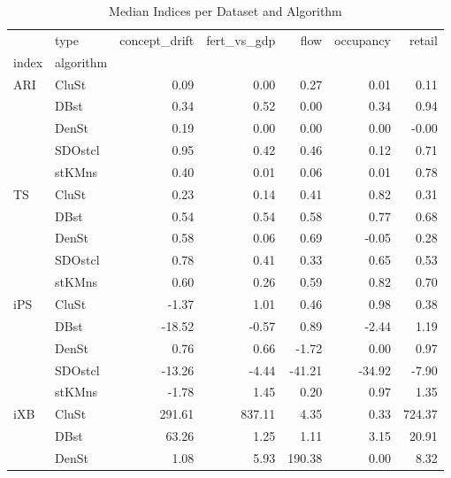 \begin{table}
\centering
\caption{Median Indices per Dataset and Algorithm}
\label{tab:median_indices}
\begin{tabular}{llrrrrr}
\toprule
     & type &  concept\_drift &  fert\_vs\_gdp &    flow &  occupancy &  retail \\
index & algorithm &                &              &         &            &         \\
\midrule
ARI & CluSt &           0.09 &         0.00 &    0.27 &       0.01 &    0.11 \\
     & DBst &           0.34 &         0.52 &    0.00 &       0.34 &    0.94 \\
     & DenSt &           0.19 &         0.00 &    0.00 &       0.00 &   -0.00 \\
     & SDOstcl &           0.95 &         0.42 &    0.46 &       0.12 &    0.71 \\
     & stKMns &           0.40 &         0.01 &    0.06 &       0.01 &    0.78 \\
TS & CluSt &           0.23 &         0.14 &    0.41 &       0.82 &    0.31 \\
     & DBst &           0.54 &         0.54 &    0.58 &       0.77 &    0.68 \\
     & DenSt &           0.58 &         0.06 &    0.69 &      -0.05 &    0.28 \\
     & SDOstcl &           0.78 &         0.41 &    0.33 &       0.65 &    0.53 \\
     & stKMns &           0.60 &         0.26 &    0.59 &       0.82 &    0.70 \\
iPS & CluSt &          -1.37 &         1.01 &    0.46 &       0.98 &    0.38 \\
     & DBst &         -18.52 &        -0.57 &    0.89 &      -2.44 &    1.19 \\
     & DenSt &           0.76 &         0.66 &   -1.72 &       0.00 &    0.97 \\
     & SDOstcl &         -13.26 &        -4.44 &  -41.21 &     -34.92 &   -7.90 \\
     & stKMns &          -1.78 &         1.45 &    0.20 &       0.97 &    1.35 \\
iXB & CluSt &         291.61 &       837.11 &    4.35 &       0.33 &  724.37 \\
     & DBst &          63.26 &         1.25 &    1.11 &       3.15 &   20.91 \\
     & DenSt &           1.08 &         5.93 &  190.38 &       0.00 &    8.32 \\

\end{tabular}
\end{table}

